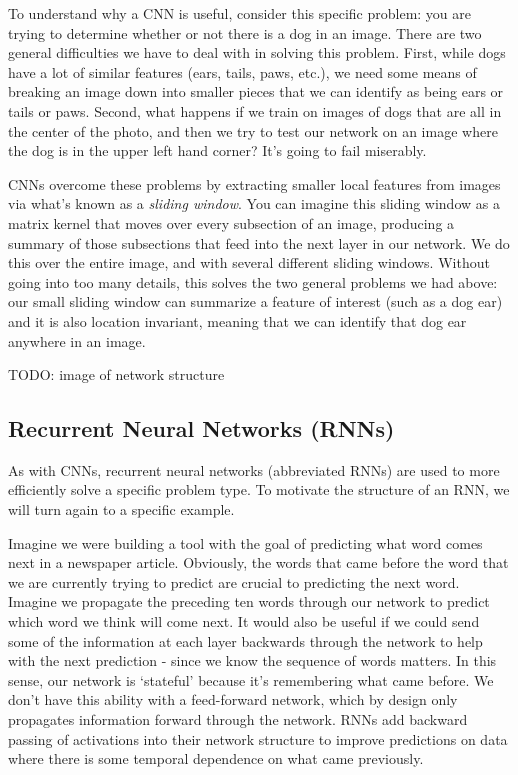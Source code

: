 To understand why a CNN is useful, consider this specific problem: you are trying to determine whether or not there is a dog in an image. There are two general difficulties we have to deal with in solving this problem. First, while dogs have a lot of similar features (ears, tails, paws, etc.), we need some means of breaking an image down into smaller pieces that we can identify as being ears or tails or paws. Second, what happens if we train on images of dogs that are all in the center of the photo, and then we try to test our network on an image where the dog is in the upper left hand corner? It's going to fail miserably.

CNNs overcome these problems by extracting smaller local features from images via what's known as a \textit{sliding window}. You can imagine this sliding window as a matrix kernel that moves over every subsection of an image, producing a summary of those subsections that feed into the next layer in our network. We do this over the entire image, and with several different sliding windows. Without going into too many details, this solves the two general problems we had above: our small sliding window can summarize a feature of interest (such as a dog ear) and it is also location invariant, meaning that we can identify that dog ear anywhere in an image.

TODO: image of network structure

\subsection{Recurrent Neural Networks (RNNs)}
As with CNNs, recurrent neural networks (abbreviated RNNs) are used to more efficiently solve a specific problem type. To motivate the structure of an RNN, we will turn again to a specific example.

Imagine we were building a tool with the goal of predicting what word comes next in a newspaper article. Obviously, the words that came before the word that we are currently trying to predict are crucial to predicting the next word. Imagine we propagate the preceding ten words through our network to predict which word we think will come next. It would also be useful if we could send some of the information at each layer backwards through the network to help with the next prediction - since we know the sequence of words matters. In this sense, our network is `stateful' because it's remembering what came before. We don't have this ability with a feed-forward network, which by design only propagates information forward through the network. RNNs add backward passing of activations into their network structure to improve predictions on data where there is some temporal dependence on what came previously.

